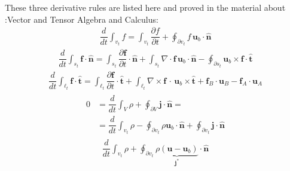 \documentclass[letterpaper,10pt,italian]{jupyterBook}
\begin{document}
\sphinxAtStartPar
These three derivative rules are listed here and proved in the material about :Vector and Tensor Algebra and Calculus:
\begin{equation*}
\begin{split}\dfrac{d}{dt} \int_{v_t} f = \int_{v_t} \dfrac{\partial f}{\partial t} + \oint_{\partial v_t} f \, \mathbf{u}_b \cdot \hat{\mathbf{n}}\end{split}
\end{equation*}\begin{equation*}
\begin{split}\dfrac{d}{dt} \int_{s_t} \mathbf{f} \cdot \hat{\mathbf{n}} = \int_{s_t} \dfrac{\partial \mathbf{f}}{\partial t} \cdot \hat{\mathbf{n}} + \int_{s_t} \nabla \cdot \mathbf{f} \, \mathbf{u}_b \cdot \hat{\mathbf{n}} - \oint_{\partial s_t} \mathbf{u}_b \times \mathbf{f} \cdot \hat{\mathbf{t}}\end{split}
\end{equation*}\begin{equation*}
\begin{split}\dfrac{d}{dt} \int_{\ell_t} \mathbf{f} \cdot \hat{\mathbf{t}} = \int_{\ell_t} \dfrac{\partial \mathbf{f}}{\partial t} \cdot \hat{\mathbf{t}} + \int_{\ell_t} \nabla \times \mathbf{f} \, \cdot \, \mathbf{u}_b \times \hat{\mathbf{t}} + \mathbf{f}_B \cdot \mathbf{u}_B - \mathbf{f}_A \cdot \mathbf{u}_A\end{split}
\end{equation*}
\sphinxAtStartPar
{}
\begin{equation*}
\begin{split}\begin{aligned}
   0 & = \dfrac{d}{dt} \int_{V} \rho + \oint_{\partial V} \mathbf{j} \cdot \hat{\mathbf{n}} = \\
   & = \dfrac{d}{dt} \int_{v_t} \rho - \oint_{\partial v_t } \rho \mathbf{u}_b \cdot \hat{\mathbf{n}} + \oint_{\partial v_t} \mathbf{j} \cdot \hat{\mathbf{n}} 
\end{aligned}\end{split}
\end{equation*}\begin{equation*}
\begin{split}
    \dfrac{d}{dt} \int_{v_t} \rho + \oint_{\partial v_t} \underbrace{\rho (\mathbf{u} - \mathbf{u}_b)}_{\mathbf{j}^*} \cdot \hat{\mathbf{n}} 
\end{split}
\end{equation*}
\end{document}
